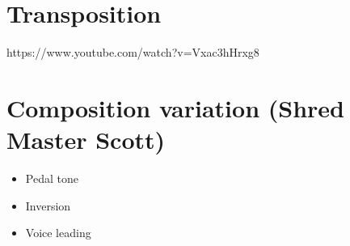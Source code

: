 \documentclass{article}
\begin{document}

\clearpage
\section{Transposition}

https://www.youtube.com/watch?v=Vxac3hHrxg8

\clearpage
\section{Composition variation (Shred Master Scott)}

\begin{itemize}
	\item Pedal tone
	\item Inversion
	\item Voice leading
\end{itemize}

\newpage
\nocite{Lizzio2023}


\end{document}

